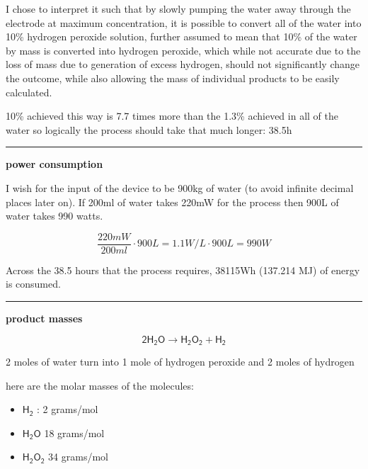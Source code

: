 \documentclass[a4paper]{article}
\begin{document}
	\medskip
	
	I chose to interpret it such that by slowly pumping the water away through the electrode at maximum concentration, it is possible to convert all of the water into 10\% hydrogen peroxide solution, further assumed to mean that 10\% of the water by mass is converted into hydrogen peroxide, which while not accurate due to the loss of mass due to generation of excess hydrogen, should not significantly change the outcome, while also allowing the mass of individual products to be easily calculated.
	
	\medskip
	
	10\% achieved this way is 7.7 times more than the 1.3\% achieved in all of the water so logically the process should take that much longer: 38.5h
	
	\medskip
	
	\noindent\hrule
	
	\begin{center}
		\textbf{power consumption}
	\end{center}
	
	\medskip
	
	I wish for the input of the device to be 900kg of water (to avoid infinite decimal places later on). If 200ml of water takes 220mW for the process then 900L of water takes 990 watts.
	
	$$ \frac{220mW}{200ml} \cdot 900L = 1.1W/L \cdot 900L = 990W $$
	
	Across the 38.5 hours that the process requires, 38115Wh (137.214 MJ) of energy is consumed.
	
	\medskip
	
	\noindent\hrule
	
	\begin{center}
		\textbf{product masses}
	\end{center}
	
	$$ \mathsf{ 2H_2O \rightarrow H_2O_2 + H_2 } $$
	
	2 moles of water turn into 1 mole of hydrogen peroxide and 2 moles of hydrogen
	
	here are the molar masses of the molecules:
	
	\begin{itemize}
		\item $\mathsf{H_2}$ : 2 grams/mol
		
		\item $\mathsf{H_2O}$ 18 grams/mol
		
		\item $\mathsf{H_2O_2}$ 34 grams/mol
	\end{itemize}
	
\end{document}
